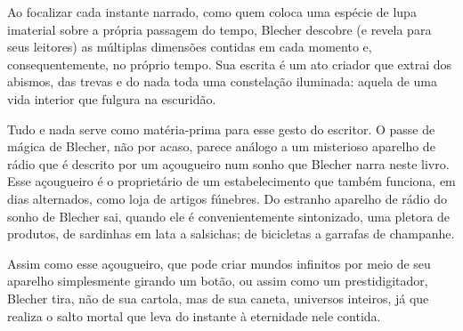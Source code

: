 
Ao focalizar cada instante narrado, como quem coloca uma espécie de lupa
imaterial sobre a própria passagem do tempo, Blecher descobre (e revela
para seus leitores) as múltiplas dimensões contidas em cada momento e,
consequentemente, no próprio tempo. Sua escrita é um ato criador que
extrai dos abismos, das trevas e do nada toda uma constelação iluminada:
aquela de uma vida interior que fulgura na escuridão.

Tudo e nada serve como matéria-prima para esse gesto do escritor. O
passe de mágica de Blecher, não por acaso, parece análogo a um
misterioso aparelho de rádio que é descrito por um açougueiro num sonho
que Blecher narra neste livro. Esse açougueiro é o proprietário de um
estabelecimento que também funciona, em dias alternados, como loja de
artigos fúnebres. Do estranho aparelho de rádio do sonho de Blecher sai,
quando ele é convenientemente sintonizado, uma pletora de produtos, de
sardinhas em lata a salsichas; de bicicletas a garrafas de champanhe.

Assim como esse açougueiro, que pode criar mundos infinitos por meio de
seu aparelho simplesmente girando um botão, ou assim como um
prestidigitador, Blecher tira, não de sua cartola, mas de sua caneta,
universos inteiros, já que realiza o salto mortal que leva do instante à
eternidade nele contida.


